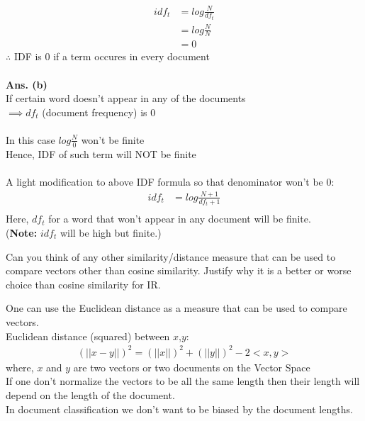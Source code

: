\documentclass[11pt]{exam}
\begin{document}
\begin{questions}
\begin{solution}
    \begin{align*}
        idf_t &= log{\frac{N}{df_t}}\\
        &= log{\frac{N}{N}}\\
        &=0
    \end{align*}
    $\therefore$ IDF is $0$ if a term occures in every document\\\\
    \textbf{Ans. (b)}\\
    If certain word doesn't appear in any of the documents\\
    $\implies df_t$ (document frequency) is $0$\\\\
    In this case $log\frac{N}{0}$ won't be finite\\
    Hence, IDF of such term will NOT be finite\\\\
    A light modification to above IDF formula so that denominator won't be $0$:
    \begin{align}
        idf_t &= log{\frac{N+1}{df_t+1}}\\
    \end{align}
    Here, $df_t$ for a word that won't appear in any document will be finite.\\
    (\textbf{Note:} $idf_t$ will be high but finite.)
\end{solution}
\question Can you think of any other similarity/distance measure that can be used to compare vectors
other than cosine similarity. Justify why it is a better or worse choice than cosine similarity
for IR.
\begin{solution}
    One can use the Euclidean distance as a measure that can be used to compare vectors.\\
    Euclidean distance (squared) between $x$,$y$:
    \begin{align}
        (||x-y||)^2=(||x||)^2+(||y||)^2-2<x,y>
    \end{align}
    where,  $x$ and $y$ are two vectors or two documents on the Vector Space\\
    If one don't normalize the vectors to be all the same length then their length will depend on the length of the document. \\
    In document classification we don't want to be biased by the document lengths.\\

\end{solution}
\end{questions}
\end{document}
